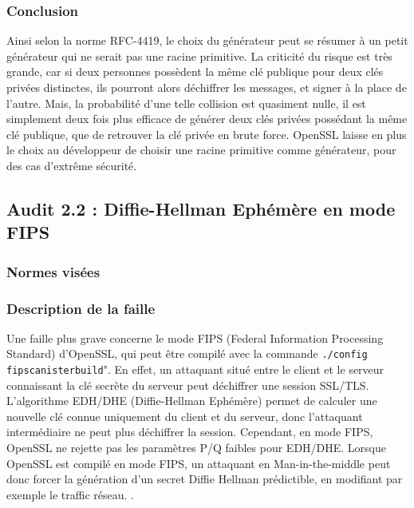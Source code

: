 		\subsubsection{Conclusion}

		Ainsi selon la norme RFC-4419, le choix du générateur peut se résumer à un petit générateur qui ne serait pas une racine primitive. La criticité du risque est très grande, car si deux personnes possèdent la même clé publique pour deux clés privées distinctes, ils pourront alors déchiffrer les messages, et signer à la place de l'autre. Mais, la probabilité d'une telle collision est quasiment nulle, il est simplement deux fois plus efficace de générer deux clés privées possédant la même clé publique, que de retrouver la clé privée en brute force.
		OpenSSL laisse en plus le choix au développeur de choisir une racine primitive comme générateur, pour des cas d'extrême sécurité.
		
	\subsection{Audit 2.2 : Diffie-Hellman Ephémère en mode FIPS}
		\subsubsection{Normes visées}


		\subsubsection{Description de la faille}
	
		Une faille plus grave concerne le mode FIPS (Federal Information Processing Standard) d'OpenSSL, qui peut être compilé avec la commande \texttt{./config fipscanisterbuild}". En effet, un attaquant situé entre le client et le serveur connaissant la clé secrète du serveur peut déchiffrer une session SSL/TLS. \\
	
		L'algorithme EDH/DHE (Diffie-Hellman Ephémère) permet de calculer une nouvelle clé connue uniquement du client et du serveur, donc l'attaquant intermédiaire ne peut plus déchiffrer la session. Cependant, en mode FIPS, OpenSSL ne rejette pas les paramètres P/Q faibles pour EDH/DHE. Lorsque OpenSSL est compilé en mode FIPS, un attaquant en Man-in-the-middle peut donc forcer la génération d'un secret Diffie Hellman prédictible, en modifiant par exemple le traffic réseau. \cite{vigilance-vul-10585} \cite{CVE-2011-5095}.

